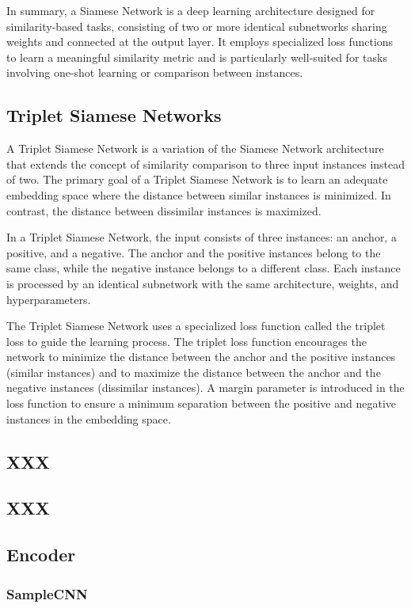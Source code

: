 In summary, a Siamese Network is a deep learning architecture designed for similarity-based tasks, consisting of two or more identical subnetworks sharing weights and connected at the output layer. It employs specialized loss functions to learn a meaningful similarity metric and is particularly well-suited for tasks involving one-shot learning or comparison between instances.

\subsection{Triplet Siamese Networks}

A Triplet Siamese Network is a variation of the Siamese Network architecture that extends the concept of similarity comparison to three input instances instead of two. The primary goal of a Triplet Siamese Network is to learn an adequate embedding space where the distance between similar instances is minimized. In contrast, the distance between dissimilar instances is maximized.

In a Triplet Siamese Network, the input consists of three instances: an anchor, a positive, and a negative. The anchor and the positive instances belong to the same class, while the negative instance belongs to a different class. Each instance is processed by an identical subnetwork with the same architecture, weights, and hyperparameters.

The Triplet Siamese Network uses a specialized loss function called the triplet loss to guide the learning process. The triplet loss function encourages the network to minimize the distance between the anchor and the positive instances (similar instances) and to maximize the distance between the anchor and the negative instances (dissimilar instances). A margin parameter is introduced in the loss function to ensure a minimum separation between the positive and negative instances in the embedding space.

\subsection{XXX}
\subsection{XXX}

\subsection{Encoder}
\subsubsection{SampleCNN}

